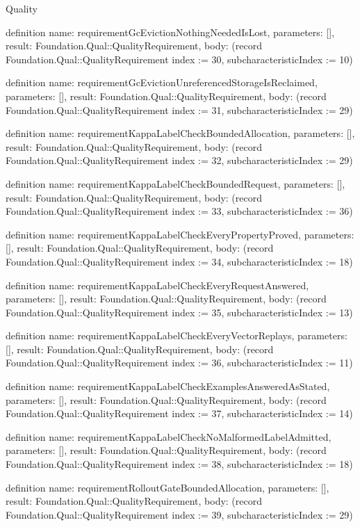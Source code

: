 \begin{lexlean}{Quality}
\begin{semanticmodule}
definition{
  name: requirementGcEvictionNothingNeededIsLost,
  parameters: [],
  result: Foundation.Qual::QualityRequirement,
  body: (record Foundation.Qual::QualityRequirement {index := 30, subcharacteristicIndex := 10})
}

definition{
  name: requirementGcEvictionUnreferencedStorageIsReclaimed,
  parameters: [],
  result: Foundation.Qual::QualityRequirement,
  body: (record Foundation.Qual::QualityRequirement {index := 31, subcharacteristicIndex := 29})
}

definition{
  name: requirementKappaLabelCheckBoundedAllocation,
  parameters: [],
  result: Foundation.Qual::QualityRequirement,
  body: (record Foundation.Qual::QualityRequirement {index := 32, subcharacteristicIndex := 29})
}

definition{
  name: requirementKappaLabelCheckBoundedRequest,
  parameters: [],
  result: Foundation.Qual::QualityRequirement,
  body: (record Foundation.Qual::QualityRequirement {index := 33, subcharacteristicIndex := 36})
}

definition{
  name: requirementKappaLabelCheckEveryPropertyProved,
  parameters: [],
  result: Foundation.Qual::QualityRequirement,
  body: (record Foundation.Qual::QualityRequirement {index := 34, subcharacteristicIndex := 18})
}

definition{
  name: requirementKappaLabelCheckEveryRequestAnswered,
  parameters: [],
  result: Foundation.Qual::QualityRequirement,
  body: (record Foundation.Qual::QualityRequirement {index := 35, subcharacteristicIndex := 13})
}

definition{
  name: requirementKappaLabelCheckEveryVectorReplays,
  parameters: [],
  result: Foundation.Qual::QualityRequirement,
  body: (record Foundation.Qual::QualityRequirement {index := 36, subcharacteristicIndex := 11})
}

definition{
  name: requirementKappaLabelCheckExamplesAnsweredAsStated,
  parameters: [],
  result: Foundation.Qual::QualityRequirement,
  body: (record Foundation.Qual::QualityRequirement {index := 37, subcharacteristicIndex := 14})
}

definition{
  name: requirementKappaLabelCheckNoMalformedLabelAdmitted,
  parameters: [],
  result: Foundation.Qual::QualityRequirement,
  body: (record Foundation.Qual::QualityRequirement {index := 38, subcharacteristicIndex := 18})
}

definition{
  name: requirementRolloutGateBoundedAllocation,
  parameters: [],
  result: Foundation.Qual::QualityRequirement,
  body: (record Foundation.Qual::QualityRequirement {index := 39, subcharacteristicIndex := 29})
}


\end{semanticmodule}
\end{lexlean}
